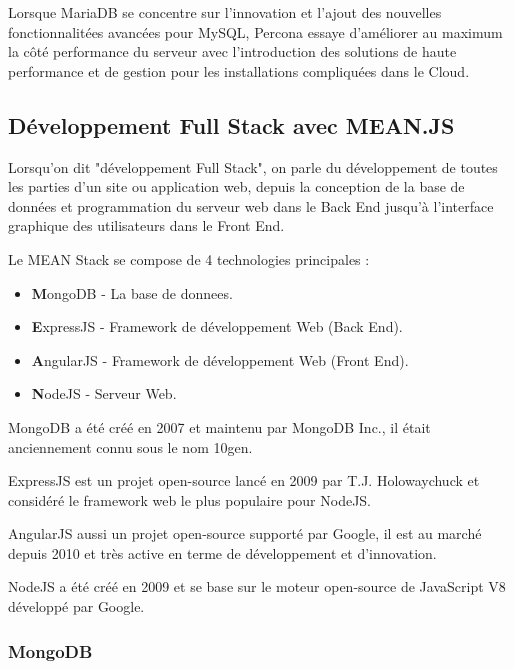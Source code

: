 \documentclass[a4paper,11pt,oneside]{report}
\begin{document}
Lorsque MariaDB se concentre sur l’innovation et l’ajout des nouvelles fonctionnalitées avancées pour MySQL, Percona essaye d’améliorer au maximum la côté performance du serveur avec l’introduction des solutions de haute performance et de gestion pour les installations compliquées dans le Cloud.
\newline

\subsection{Développement Full Stack avec MEAN.JS}

Lorsqu'on dit "développement Full Stack", on parle du développement de toutes les parties d'un site ou application web, depuis la conception de la base de données et programmation du serveur web dans le Back End jusqu'à l'interface graphique des utilisateurs dans le Front End.
\newline

Le MEAN\cite{gettingMEAN} Stack se compose de 4 technologies principales :
\begin{itemize}
\item \textbf{M}ongoDB - La base de donnees.
\item \textbf{E}xpressJS - Framework de développement Web (Back End).
\item \textbf{A}ngularJS - Framework de développement Web (Front End).
\item \textbf{N}odeJS - Serveur Web.
\newline
\end{itemize}


MongoDB a été créé en 2007 et maintenu par MongoDB Inc., il était anciennement connu sous le nom 10gen.
\newline

ExpressJS est un projet open-source lancé en 2009 par T.J. Holowaychuck et considéré le framework web le plus populaire pour NodeJS.
\newline

AngularJS aussi un projet open-source supporté par Google, il est au marché depuis 2010 et très active en terme de développement et d'innovation.
\newline

NodeJS a été créé en 2009 et se base sur le moteur open-source de JavaScript V8 développé par Google.

\subsubsection{MongoDB}
\end{document}
